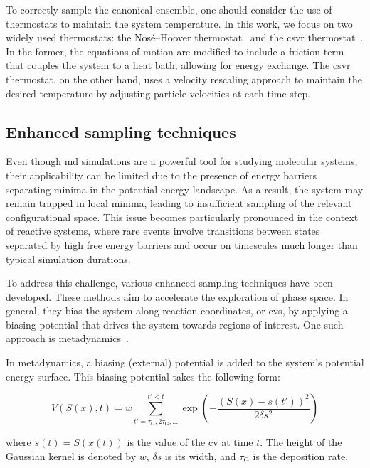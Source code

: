 To correctly sample the canonical ensemble, one should consider the use of thermostats to maintain the system temperature. In this work, we focus on two widely used thermostats: the Nos\'e--Hoover thermostat~\citep{noseUnifiedFormulationConstant1984, hooverCanonicalDynamicsEquilibrium1985} and the \ac{csvr} thermostat~\citep{bussiCanonicalSamplingVelocity2007}. In the former, the equations of motion are modified to include a friction term that couples the system to a heat bath, allowing for energy exchange. The \ac{csvr} thermostat, on the other hand, uses a velocity rescaling approach to maintain the desired temperature by adjusting particle velocities at each time step.



\subsection{Enhanced sampling techniques}
Even though \ac{md} simulations are a powerful tool for studying molecular systems, their applicability can be limited due to the presence of energy barriers separating minima in the potential energy landscape. As a result, the system may remain trapped in local minima, leading to insufficient sampling of the relevant configurational space. This issue becomes particularly pronounced in the context of reactive systems, where rare events involve transitions between states separated by high free energy barriers and occur on timescales much longer than typical simulation durations.

To address this challenge, various enhanced sampling techniques have been developed. These methods aim to accelerate the exploration of phase space. In general, they bias the system along reaction coordinates, or \acp{cv}, by applying a biasing potential that drives the system towards regions of interest. One such approach is metadynamics~\citep{laioEscapingFreeenergyMinima2002, laioMetadynamicsMethodSimulate2008}.

In metadynamics, a biasing (external) potential is added to the system's potential energy surface. This biasing potential takes the following form:

\begin{equation}
    V(S(x), t) = w \sum_{t' = \tau_{\text{G}}, 2\tau_{\text{G}}, \ldots}^{t' < t} \exp\left(-\frac{(S(x) - s(t'))^2}{2\delta s^2}\right)
    \label{eq:biasing_potential}
\end{equation}

where $s(t) = S(x(t))$ is the value of the \ac{cv} at time $t$. The height of the Gaussian kernel is denoted by $w$, $\delta s$ is its width, and $\tau_{\text{G}}$ is the deposition rate.

